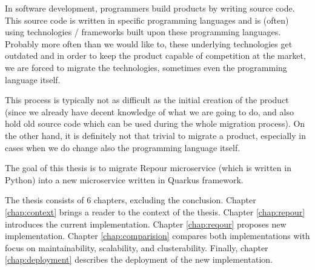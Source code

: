 \documentclass[../../main.tex]{subfiles}
\begin{document}
In software development, programmers build products by writing source code. This source code is written in specific programming languages and is (often) using technologies / frameworks built upon these programming languages. Probably more often than we would like to, these underlying technologies get outdated and in order to keep the product capable of competition at the market, we are forced to migrate the technologies, sometimes even the programming language itself.

This process is typically not as difficult as the initial creation of the product (since we already have decent knowledge of what we are going to do, and also hold old source code which can be used during the whole migration process). On the other hand, it is definitely not that trivial to migrate a product, especially in cases when we do change also the programming language itself.

The goal of this thesis is to migrate Repour microservice (which is written in Python) into a new microservice written in Quarkus framework.

The thesis consists of 6 chapters, excluding the conclusion. Chapter \ref{chap:context} brings a reader to the context of the thesis. Chapter \ref{chap:repour} introduces the current implementation. Chapter \ref{chap:reqour} proposes new implementation. Chapter \ref{chap:comparision} compares both implementations with focus on maintainability, scalability, and clusterability. Finally, chapter \ref{chap:deployment} describes the deployment of the new implementation.
\end{document}
